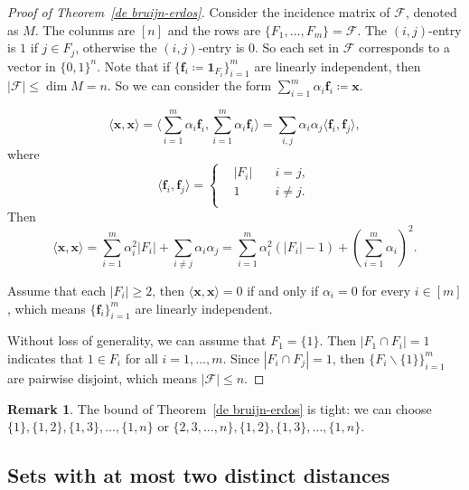 \documentclass{article}
\theoremstyle{definition}
\newtheorem{remark}[theorem]{Remark}
\begin{document}
\begin{proof}[Proof of Theorem~\ref{de bruijn-erdos}]
    Consider the incidence matrix of $\mathcal{F}$, denoted as $M$. The colunms are $[n]$ and the rows are $\{ F_{1},\ldots,F_{m} \}=\mathcal{F}$. The $(i,j)$-entry is $1$ if $j\in F_{j}$, otherwise the $(i,j)$-entry is $0$. So each set in $\mathcal{F}$ corresponds to a vector in $\{ 0,1 \}^{n}$. Note that if $\{ \boldsymbol{f}_{i}\coloneqq\mathbf{1}_{F_{i}} \}_{i=1}^{m}$ are linearly independent, then $|\mathcal{F}|\leq \dim M =n$. So we can consider the form $\sum_{i=1}^{m} \alpha_{i}\boldsymbol{f}_{i}\coloneqq \boldsymbol{x}$.

    $$\langle \boldsymbol{x},\boldsymbol{x} \rangle = \Big\langle \sum_{i=1}^{m} \alpha_{i}\boldsymbol{f}_{i},\sum_{i=1}^{m} \alpha_{i}\boldsymbol{f}_{i} \Big\rangle = \sum_{i,j}\alpha_{i}\alpha_{j}\langle \boldsymbol{f}_{i},\boldsymbol{f}_{j} \rangle,$$
    where
    $$\langle \boldsymbol{f}_{i},\boldsymbol{f}_{j} \rangle = \left\{
    	\begin{aligned}
    	&|F_{i}| \quad &i=j,\\
    	&1 \quad &i\neq j.\\
    	\end{aligned}
    	\right
    	.
    $$
    Then
    $$\langle \boldsymbol{x},\boldsymbol{x} \rangle = \sum_{i=1}^{m}\alpha_{i}^{2}|F_{i}|+\sum_{i\neq j}\alpha_{i}\alpha_{j}=\sum_{i=1}^{m}\alpha_{i}^{2}(|F_{i}|-1)+(\sum_{i=1}^{m}\alpha_{i})^{2}.$$
    
    Assume that each $|F_{i}|\geq 2$, then $\langle \boldsymbol{x},\boldsymbol{x} \rangle=0$ if and only if $\alpha_{i}=0$ for every $i\in [m]$, which means $\{ \boldsymbol{f}_{i} \}_{i=1}^{m}$ are linearly independent.

    Without loss of generality, we can assume that $F_{1}=\{ 1 \}$. Then $|F_{1}\cap F_{i}|=1$ indicates that $1\in F_{i}$ for all $i=1,\ldots,m$. Since $|F_{i}\cap F_{j}|=1$, then $\{ F_{i}\backslash\{ 1 \} \}_{i=1}^{m}$ are pairwise disjoint, which means $|\mathcal{F}|\leq n$.
\end{proof}

\begin{remark}
    The bound of Theorem~\ref{de bruijn-erdos} is tight: we can choose $\{ 1 \},\{ 1,2 \},\{ 1,3 \},\ldots,\{ 1,n \}$ or $\{ 2,3,\ldots,n \},\{ 1,2 \},\{ 1,3 \},\ldots,\{ 1,n \}$.
\end{remark}

\subsection{Sets with at most two distinct distances}
\end{document}

